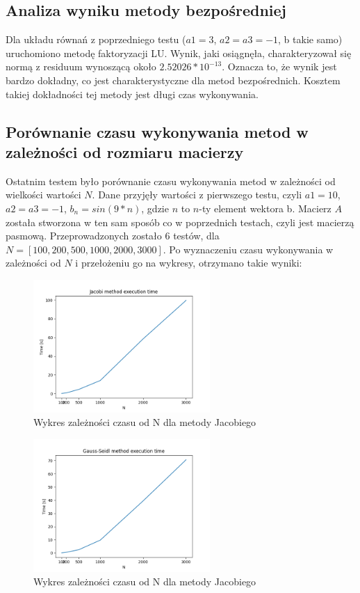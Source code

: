 \documentclass{article}
\begin{document}
\subsection{Analiza wyniku metody bezpośredniej}

Dla układu równań z poprzedniego testu ($a1=3$, $a2=a3=-1$, b takie samo) uruchomiono metodę faktoryzacji LU. Wynik, jaki osiągnęła, charakteryzował się normą z residuum wynoszącą około $2.52026*10^{-13}$. Oznacza to, że wynik jest bardzo dokładny, co jest charakterystyczne dla metod bezpośrednich. Kosztem takiej dokładności tej metody jest długi czas wykonywania.

\subsection{Porównanie czasu wykonywania metod w zależności od rozmiaru macierzy}

Ostatnim testem było porównanie czasu wykonywania metod w zależności od wielkości wartości $N$. Dane przyjęły wartości z pierwszego testu, czyli $a1=10$, $a2=a3=-1$, $b_n=sin(9*n)$, gdzie $n$ to $n$-ty element wektora b. Macierz $A$ została stworzona w ten sam sposób co w poprzednich testach, czyli jest macierzą pasmową. Przeprowadzonych zostało 6 testów, dla $N=[100, 200, 500, 1000, 2000, 3000]$. Po wyznaczeniu czasu wykonywania w zależności od $N$ i przełożeniu go na wykresy, otrzymano takie wyniki:

\begin{figure}[h!]
  \centering
  \includegraphics[width=0.6\textwidth]{img/jacobi.png}
  \caption{Wykres zależności czasu od N dla metody Jacobiego}
\end{figure}

\begin{figure}[h!]
  \centering
  \includegraphics[width=0.6\textwidth]{img/gauss.png}
  \caption{Wykres zależności czasu od N dla metody Jacobiego}
\end{figure}
\end{document}

